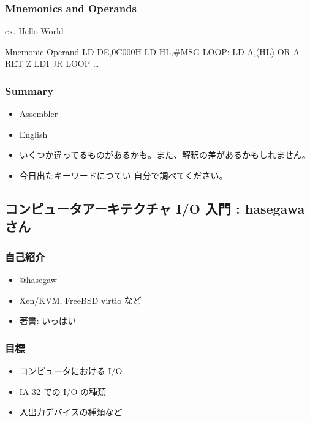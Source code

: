 \documentclass{jsarticle}
\begin{document}
\subsubsection{Mnemonics and Operands}

ex. Hello World

\textbar{} Mnemonic \textbar{} Operand \textbar{} LD \textbar{}
DE,0C000H \textbar{} LD \textbar{} HL,\#MSG LOOP: \textbar{} LD
\textbar{} A,(HL) \textbar{} OR \textbar{} A \textbar{} RET \textbar{} Z
\textbar{} LDI \textbar{} \textbar{} JR \textbar{} LOOP \ldots{}

\subsubsection{Summary}

\begin{itemize}
\item
  Assembler
\item
  English
\item
  いくつか違ってるものがあるかも。また、解釈の差があるかもしれません。
\item
  今日出たキーワードにつてい 自分で調べてください。
\end{itemize}
\subsection{コンピュータアーキテクチャ I/O 入門 : hasegawa さん}

\subsubsection{自己紹介}

\begin{itemize}
\item
  @hasegaw
\item
  Xen/KVM, FreeBSD virtio など
\item
  著書: いっぱい
\end{itemize}
\subsubsection{目標}

\begin{itemize}
\item
  コンピュータにおける I/O
\item
  IA-32 での I/O の種類
\item
  入出力デバイスの種類など
\end{itemize}
\end{document}

